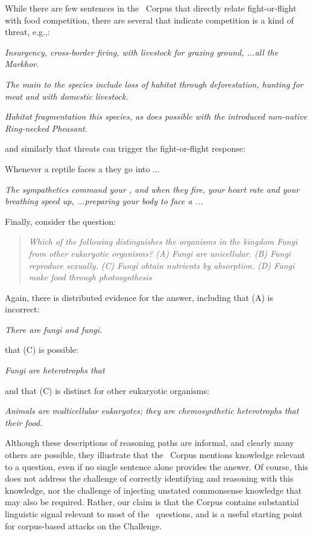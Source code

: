 While there are few sentences in the \ASC~Corpus that directly relate fight-or-flight with food competition, there are several that indicate competition is a kind of threat, e.g.,:
\begin{ite}
\item {\it Insurgency, cross-border firing,  with livestock for grazing ground, ...all  the Markhor.}
\item {\it The main  to the species include loss of habitat through deforestation, hunting for meat and  with domestic livestock.}
\item {\it Habitat fragmentation  this species, as does possible  with the introduced non-native Ring-necked Pheasant.}
\end{ite}
and similarly that threats can trigger the fight-or-flight response:
\begin{ite}
\item Whenever a reptile faces a  they go into ...
\item {\it The sympathetics command your , and when they fire, your heart rate and your breathing speed up, ...preparing your body to face a ...}
\end{ite}
\noindent
Finally, consider the question:
\begin{quote}
{\it Which of the following distinguishes the organisms in the kingdom Fungi from other eukaryotic organisms? (A) Fungi are unicellular. (B) Fungi reproduce sexually. (C) Fungi obtain nutrients by absorption. \bfit{[correct]} (D) Fungi make food through photosynthesis}
\end{quote}
Again, there is distributed evidence for the answer, including that (A) is incorrect:
\begin{ite}
\item {\it There are  fungi and  fungi.}
\end{ite}
that (C) is possible:
\begin{ite}
\item {\it Fungi are heterotrophs that }
\end{ite}
and that (C) is distinct for other eukaryotic organisms:
\begin{ite}
\item {\it Animals are multicellular eukaryotes; they are chemosynthetic heterotrophs that  their food.}
\end{ite}
Although these descriptions of reasoning paths are informal, and clearly many others are possible, they illustrate
that the \ASC~Corpus mentions knowledge relevant to a question, even if no single sentence alone provides the answer.
Of course, this does not address the challenge of correctly identifying and reasoning with this knowledge, nor
the challenge of injecting unstated commonsense knowledge that may also be required. Rather, our claim is
that the Corpus contains substantial linguistic signal relevant to most of the \ASC~questions, and
is a useful starting point for corpus-based attacks on the Challenge.

